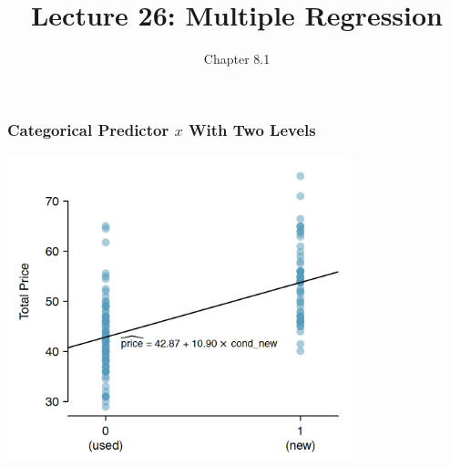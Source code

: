 \documentclass[handout]{beamer}
\title{Lecture 26: Multiple Regression}
\author{Chapter 8.1}
\date{}
\begin{document}
\begin{frame}
\titlepage
\end{frame}


\begin{frame}[fragile]
\frametitle{Categorical Predictor $x$ With Two Levels}

\begin{center}
\includegraphics[width=0.75\textwidth]{figure/mario_kart.png}
\end{center}

\end{frame}
\end{document}

